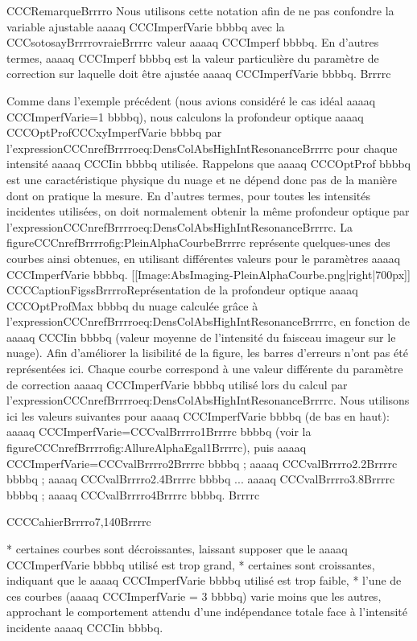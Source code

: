 CCCRemarqueBrrrro
Nous utilisons cette notation afin de ne pas confondre la variable ajustable aaaaq CCCImperfVarie bbbbq avec la CCCsotosayBrrrrovraieBrrrrc valeur aaaaq CCCImperf bbbbq. En d'autres termes, aaaaq CCCImperf bbbbq est la valeur particulière du paramètre de correction sur laquelle doit être ajustée aaaaq CCCImperfVarie bbbbq.
Brrrrc



Comme dans l'exemple précédent (nous avions considéré le cas idéal aaaaq CCCImperfVarie=1 bbbbq), nous calculons la profondeur optique aaaaq CCCOptProfCCCxyImperfVarie bbbbq par l'expressionCCCnrefBrrrroeq:DensColAbsHighIntResonanceBrrrrc pour chaque intensité aaaaq CCCIin bbbbq utilisée.
Rappelons que aaaaq CCCOptProf bbbbq est une caractéristique physique du nuage et ne dépend donc pas de la manière dont on pratique la mesure. En d'autres termes, pour toutes les intensités incidentes utilisées, on doit normalement obtenir la même profondeur optique par l'expressionCCCnrefBrrrroeq:DensColAbsHighIntResonanceBrrrrc.
La figureCCCnrefBrrrrofig:PleinAlphaCourbeBrrrrc représente quelques-unes des courbes ainsi obtenues, en utilisant différentes valeurs pour le paramètres aaaaq CCCImperfVarie bbbbq.
[[Image:AbsImaging-PleinAlphaCourbe.png|right|700px]]
CCCCaptionFigssBrrrroReprésentation de la profondeur optique aaaaq CCCOptProfMax bbbbq du nuage calculée grâce à l'expressionCCCnrefBrrrroeq:DensColAbsHighIntResonanceBrrrrc, en fonction de aaaaq CCCIin bbbbq (valeur moyenne de l'intensité du faisceau imageur sur le nuage). Afin d'améliorer la lisibilité de la figure, les barres d'erreurs n'ont pas été représentées ici.
Chaque courbe correspond à une valeur différente du paramètre de correction aaaaq CCCImperfVarie bbbbq utilisé lors du calcul par l'expressionCCCnrefBrrrroeq:DensColAbsHighIntResonanceBrrrrc. 
Nous utilisons ici les valeurs suivantes pour aaaaq CCCImperfVarie bbbbq (de bas en haut):  aaaaq CCCImperfVarie=CCCvalBrrrro1Brrrrc bbbbq (voir la figureCCCnrefBrrrrofig:AllureAlphaEgal1Brrrrc), puis aaaaq CCCImperfVarie=CCCvalBrrrro2Brrrrc bbbbq ; aaaaq CCCvalBrrrro2.2Brrrrc bbbbq ; aaaaq CCCvalBrrrro2.4Brrrrc bbbbq ... aaaaq CCCvalBrrrro3.8Brrrrc bbbbq ; aaaaq CCCvalBrrrro4Brrrrc bbbbq.
Brrrrc

CCCCahierBrrrro7,140Brrrrc

	* certaines courbes sont décroissantes, laissant supposer que le aaaaq CCCImperfVarie bbbbq utilisé est trop grand, 
	* certaines sont croissantes, indiquant que le aaaaq CCCImperfVarie bbbbq utilisé est trop faible,
	* l'une de ces courbes (aaaaq CCCImperfVarie = 3 bbbbq) varie moins que les autres, approchant le comportement attendu d'une indépendance totale face à l'intensité incidente aaaaq CCCIin bbbbq.



